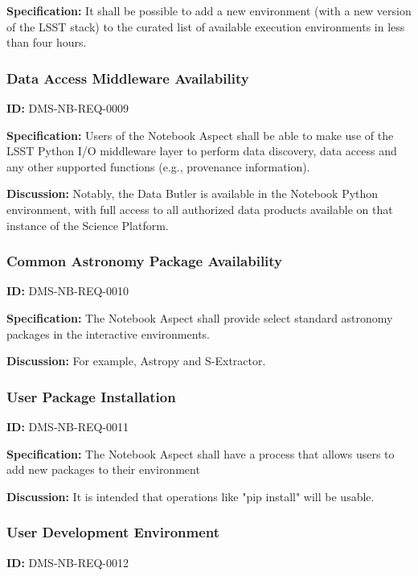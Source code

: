 \documentclass[SE,toc,lsstdraft]{lsstdoc}
\begin{document}
\textbf{Specification:}
It shall be possible to add a new environment (with a new version of the LSST stack) to the curated list of available execution environments in less than four hours.

\subsubsection{Data Access Middleware Availability}

\label{DMS-NB-REQ-0009}
\textbf{ID:} DMS-NB-REQ-0009

\textbf{Specification:}
Users of the Notebook Aspect shall be able to make use of the LSST Python I/O middleware layer to perform data discovery, data access and any other supported functions  (e.g., provenance information).

\textbf{Discussion:}
Notably, the Data Butler is available in the Notebook Python environment, with full access to all authorized data products available on that instance of the Science Platform.

\subsubsection{Common Astronomy Package Availability}

\label{DMS-NB-REQ-0010}
\textbf{ID:} DMS-NB-REQ-0010

\textbf{Specification:}
The Notebook Aspect shall provide select standard astronomy packages in the interactive environments.

\textbf{Discussion:}
For example, Astropy and S-Extractor.

\subsubsection{User Package Installation}

\label{DMS-NB-REQ-0011}
\textbf{ID:} DMS-NB-REQ-0011

\textbf{Specification:}
The Notebook Aspect shall have a process that allows users to add new packages to their environment

\textbf{Discussion:}
It is intended that operations like "pip install" will be usable.

\subsubsection{User Development Environment}

\label{DMS-NB-REQ-0012}
\textbf{ID:} DMS-NB-REQ-0012
\end{document}
